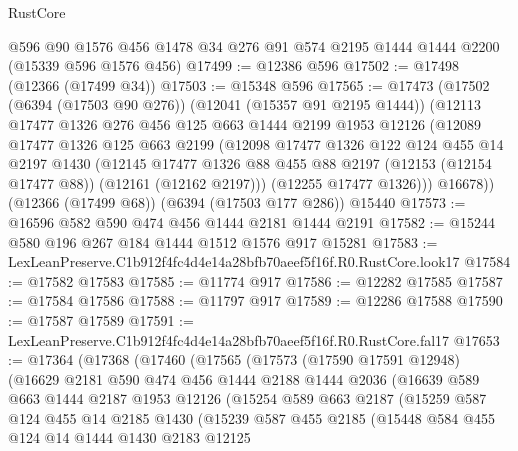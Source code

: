 \begin{lexlean}{RustCore}
\begin{coremodule}
    @596
    @90
    @1576
    @456
    @1478
    @34
    @276
    @91
    @574
    @2195
    @1444
    @1444
    @2200
    (@15339 @596 @1576 @456)
@17499 := @12386 @596
@17502 := @17498 (@12366 (@17499 @34))
@17503 := @15348 @596
@17565 := @17473
    (@17502
      (@6394 (@17503 @90 @276))
      (@12041 (@15357 @91 @2195 @1444))
      (@12113
        @17477
        @1326
        @276
        @456
        @125
        @663
        @1444
        @2199
        @1953
        @12126
        (@12089
          @17477
          @1326
          @125
          @663
          @2199
          (@12098
            @17477
            @1326
            @122
            @124
            @455
            @14
            @2197
            @1430
            (@12145
              @17477
              @1326
              @88
              @455
              @88
              @2197
              (@12153 (@12154 @17477 @88))
              (@12161 (@12162 @2197)))
            (@12255 @17477 @1326)))
        @16678))
    (@12366 (@17499 @68))
    (@6394 (@17503 @177 @286))
    @15440
@17573 := @16596 @582 @590 @474 @456 @1444 @2181 @1444 @2191
@17582 := @15244 @580 @196 @267 @184 @1444 @1512 @1576 @917 @15281
@17583 := LexLeanPreserve.C1b912f4fc4d4e14a28bfb70aeef5f16f.R0.RustCore.look17
@17584 := @17582 @17583
@17585 := @11774 @917
@17586 := @12282 @17585
@17587 := @17584 @17586
@17588 := @11797 @917
@17589 := @12286 @17588
@17590 := @17587 @17589
@17591 := LexLeanPreserve.C1b912f4fc4d4e14a28bfb70aeef5f16f.R0.RustCore.fal17
@17653 := @17364
    (@17368
      (@17460
        (@17565
          (@17573
            (@17590 @17591 @12948)
            (@16629
              @2181
              @590
              @474
              @456
              @1444
              @2188
              @1444
              @2036
              (@16639
                @589
                @663
                @1444
                @2187
                @1953
                @12126
                (@15254
                  @589
                  @663
                  @2187
                  (@15259
                    @587
                    @124
                    @455
                    @14
                    @2185
                    @1430
                    (@15239
                      @587
                      @455
                      @2185
                      (@15448
                        @584
                        @455
                        @124
                        @14
                        @1444
                        @1430
                        @2183
                        @12125

\end{coremodule}
\end{lexlean}
